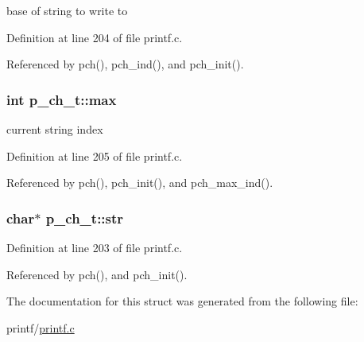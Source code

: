 base of string to write to 



Definition at line 204 of file printf.\+c.



Referenced by pch(), pch\+\_\+ind(), and pch\+\_\+init().

\subsubsection[{\texorpdfstring{max}{max}}]{\setlength{\rightskip}{0pt plus 5cm}int p\+\_\+ch\+\_\+t\+::max}\hypertarget{structp__ch__t_a0dee9f28e498d427e53051b7e1846d34}{}\label{structp__ch__t_a0dee9f28e498d427e53051b7e1846d34}


current string index 



Definition at line 205 of file printf.\+c.



Referenced by pch(), pch\+\_\+init(), and pch\+\_\+max\+\_\+ind().

\subsubsection[{\texorpdfstring{str}{str}}]{\setlength{\rightskip}{0pt plus 5cm}char$\ast$ p\+\_\+ch\+\_\+t\+::str}\hypertarget{structp__ch__t_aa3c8616342a2717bc714bf1b6d00516f}{}\label{structp__ch__t_aa3c8616342a2717bc714bf1b6d00516f}


Definition at line 203 of file printf.\+c.



Referenced by pch(), and pch\+\_\+init().



The documentation for this struct was generated from the following file\+:\begin{DoxyCompactItemize}
\item 
printf/\hyperlink{printf_8c}{printf.\+c}\end{DoxyCompactItemize}
